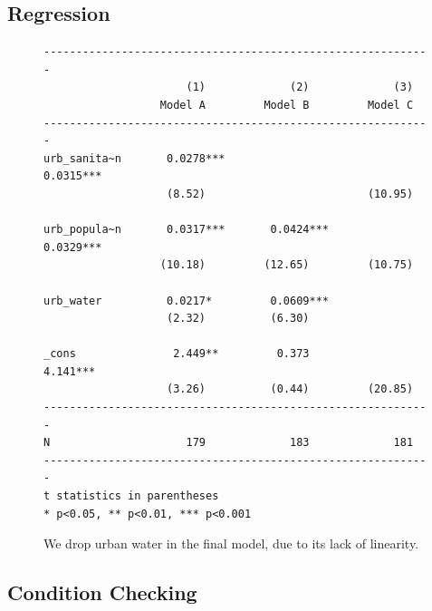 \documentclass[12pt]{article}
\begin{document}
\subsection{Regression}

\begin{figure}[h!]
\begin{singlespace}
\small
\begin{verbatim}
------------------------------------------------------------
                      (1)             (2)             (3)
                  Model A         Model B         Model C
------------------------------------------------------------
urb_sanita~n       0.0278***                       0.0315***
                   (8.52)                         (10.95)

urb_popula~n       0.0317***       0.0424***       0.0329***
                  (10.18)         (12.65)         (10.75)

urb_water          0.0217*         0.0609***
                   (2.32)          (6.30)

_cons               2.449**         0.373           4.141***
                   (3.26)          (0.44)         (20.85)
------------------------------------------------------------
N                     179             183             181
------------------------------------------------------------
t statistics in parentheses
* p<0.05, ** p<0.01, *** p<0.001
\end{verbatim}
\end{singlespace}
\caption{\label{urban_model_regressions}We drop urban water in the final model, due to its lack of linearity.}
\end{figure}


\subsection{Condition Checking}










\end{document}
